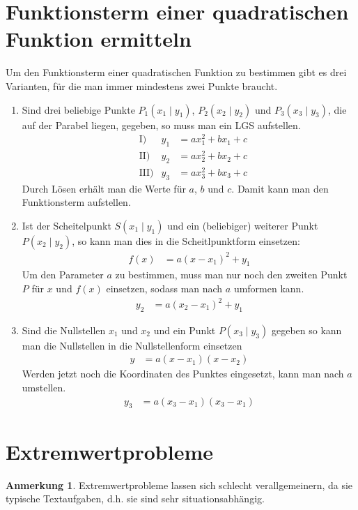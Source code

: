 \documentclass{report}
\theoremstyle{definition}
\theoremstyle{definition}
\theoremstyle{an}
\newtheorem{anm}{Anmerkung}[section]
\theoremstyle{lem}
\theoremstyle{def}
\theoremstyle{def}
\begin{document}
	\section{Funktionsterm einer quadratischen Funktion ermitteln}
	Um den Funktionsterm einer quadratischen Funktion zu bestimmen gibt es drei Varianten, für die man immer mindestens zwei Punkte braucht.
	\begin{enumerate}
		\item Sind drei beliebige Punkte $P_1(x_1\mid y_1)$, $P_2(x_2\mid y_2)$ und $P_3(x_3 \mid y_3)$, die auf der Parabel liegen, gegeben, so muss man ein LGS aufstellen.
		\begin{align}
			&\text{I)}& y_1&=ax_1^2+bx_1+c \\
			& \text{II)}& y_2&=ax_2^2+bx_2+c \\
			& \text{III)}& y_3&=ax_3^2+bx_3+c
		\end{align}
		Durch Lösen erhält man die Werte für $a$, $b$ und $c$. Damit kann man den Funktionsterm aufstellen.
		\item Ist der Scheitelpunkt $S(x_1\mid y_1)$ und ein (beliebiger) weiterer Punkt $P(x_2\mid y_2)$, so kann man dies in die Scheitlpunktform einsetzen:
		\begin{align}
			f(x)&=a(x-x_1)^2+y_1
		\end{align}
		Um den Parameter $a$ zu bestimmen, muss man nur noch den zweiten Punkt $P$ für $x$ und $f(x)$ einsetzen, sodass man nach $a$ umformen kann.
		\begin{align}
			y_2&=a(x_2-x_1)^2+y_1
		\end{align} 
		\item Sind die Nullstellen $x_1$ und $x_2$ und ein Punkt $P(x_3\mid y_3)$ gegeben so kann man die Nullstellen in die Nullstellenform einsetzen
		\begin{align}
			y&=a(x-x_1)(x-x_2)
		\end{align} 
		Werden jetzt noch die Koordinaten des Punktes eingesetzt, kann man nach $a$ umstellen.
		\begin{align}
			y_3&=a(x_3-x_1)(x_3-x_1)
		\end{align}
	\end{enumerate}

	\pagebreak
	
	\section{Extremwertprobleme}
	
	\begin{anm}
		Extremwertprobleme lassen sich schlecht verallgemeinern, da sie typische Textaufgaben, d.h. sie sind sehr situationsabhängig.
	\end{anm}
	
\end{document}
